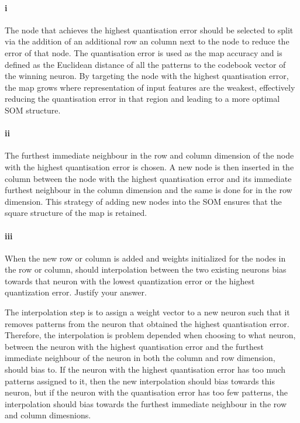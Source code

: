 \documentclass[10pt]{article}
\begin{document}
\paragraph*{i}

The node that achieves the highest quantisation error should be selected to split via the addition
of an additional row an column next to the node to reduce the error of that node.
The quantisation error is used as the map accuracy and is defined as the Euclidean
distance of all the patterns to the codebook vector of the winning neuron.
By targeting the node with the highest quantisation
error, the map grows where representation of input features are the weakest, effectively
reducing the quantisation error in that region and leading to a more optimal SOM structure.

\paragraph*{ii}

The furthest immediate neighbour in the row and column dimension of the node with the
highest quantisation error is chosen. A new node is then inserted in the column between
the node with the highest quantisation error and its immediate furthest neighbour
in the column dimension and the same is done for in the row dimension. This strategy
of adding new nodes into the SOM ensures that the square structure of the map is retained.

\paragraph*{iii}

When the new row or column is added and weights initialized for the nodes in the row or column,
should interpolation between the two existing neurons bias towards that neuron with the lowest
quantization error or the highest quantization error. Justify your answer.

The interpolation step is to assign a weight vector to a new neuron such that it removes
patterns from the neuron that obtained the highest quantisation error. Therefore, the
interpolation is problem depended when choosing to what neuron, between the neuron
with the highest quantisation error and the furthest immediate neighbour of the neuron in both the column and row dimension,
should bias to. If the neuron with the highest quantisation error has too much patterns assigned to
it, then the new interpolation should bias towards this neuron, but if the neuron with the quantisation
error has too few patterns, the interpolation should bias towards the furthest immediate neighbour
in the row and column dimesnions.
\end{document}
